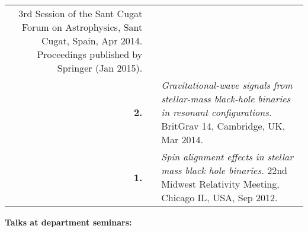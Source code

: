 \documentclass[letterpaper]{moderncv}
\begin{document}
{\begin{longtable}{rp{0.4cm}p{15.8cm}}
\newline{} 
3rd Session of the Sant Cugat Forum on Astrophysics, Sant Cugat, Spain, Apr 2014.
\newline{} 
Proceedings published by Springer (Jan 2015).
\vspace{0.05cm}\\
%
\textbf{2.} & & \textit{Gravitational-wave signals from stellar-mass black-hole binaries in resonant configurations.}
\newline{} 
BritGrav 14, Cambridge, UK, Mar 2014.
\vspace{0.05cm}\\
%
\textbf{1.} & & \textit{Spin alignment effects in stellar mass black hole binaries.}
\newline{} 
22nd Midwest Relativity Meeting, Chicago IL, USA, Sep 2012.
\vspace{0.05cm}\\
\end{longtable}
}

\textcolor{color1}{\textbf{Talks at department seminars:}}
\vspace{-0.5cm}
\end{document}
